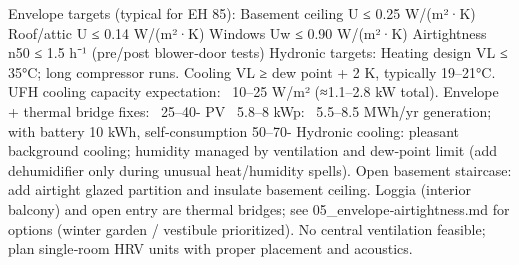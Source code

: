 \markdownRendererSectionEnd \markdownRendererSectionBegin
{}\markdownRendererInterblockSeparator
{}\markdownRendererUlBeginTight
\markdownRendererUlItem Envelope targets (typical for EH 85):\markdownRendererUlItemEnd 
\markdownRendererUlItem Basement ceiling U ≤ 0.25 W/(m²·K)\markdownRendererUlItemEnd 
\markdownRendererUlItem Roof/attic U ≤ 0.14 W/(m²·K)\markdownRendererUlItemEnd 
\markdownRendererUlItem Windows Uw ≤ 0.90 W/(m²·K)\markdownRendererUlItemEnd 
\markdownRendererUlItem Airtightness n50 ≤ 1.5 h⁻¹ (pre/post blower‑door tests)\markdownRendererUlItemEnd 
\markdownRendererUlItem Hydronic targets:\markdownRendererUlItemEnd 
\markdownRendererUlItem Heating design VL ≤ 35°C; long compressor runs.\markdownRendererUlItemEnd 
\markdownRendererUlItem Cooling VL ≥ dew point + 2 K, typically 19–21°C.\markdownRendererUlItemEnd 
\markdownRendererUlItem UFH cooling capacity expectation: ~10–25 W/m² (≈1.1–2.8 kW total).\markdownRendererUlItemEnd 
\markdownRendererUlEndTight \markdownRendererInterblockSeparator
{}
\markdownRendererSectionEnd \markdownRendererSectionBegin
{}\markdownRendererInterblockSeparator
{}\markdownRendererUlBeginTight
\markdownRendererUlItem Envelope + thermal bridge fixes: ~25–40- PV ~5.8–8 kWp: ~5.5–8.5 MWh/yr generation; with battery 10 kWh, self‑consumption 50–70- Hydronic cooling: pleasant background cooling; humidity managed by ventilation and dew‑point limit (add dehumidifier only during unusual heat/humidity spells).\markdownRendererUlItemEnd 
\markdownRendererUlEndTight \markdownRendererInterblockSeparator
{}
\markdownRendererSectionEnd \markdownRendererSectionBegin
{}\markdownRendererInterblockSeparator
{}\markdownRendererUlBeginTight
\markdownRendererUlItem Open basement staircase: add airtight glazed partition and insulate basement ceiling.\markdownRendererUlItemEnd 
\markdownRendererUlItem Loggia (interior balcony) and open entry are thermal bridges; see 05_envelope‑airtightness.md for options (winter garden / vestibule prioritized).\markdownRendererUlItemEnd 
\markdownRendererUlItem No central ventilation feasible; plan single‑room HRV units with proper placement and acoustics.\markdownRendererUlItemEnd 
\markdownRendererUlEndTight 
\markdownRendererSectionEnd 
\markdownRendererSectionEnd \markdownRendererDocumentEnd